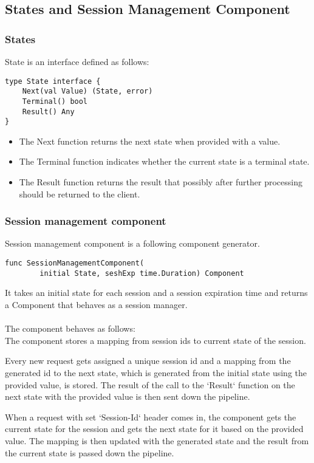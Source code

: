 \documentclass[12pt,a4paper]{article}
\begin{document}
\subsection{States and Session Management Component}
\subsubsection{States}
State is an interface defined as follows:

\begin{lstlisting}
type State interface {
    Next(val Value) (State, error)
    Terminal() bool
    Result() Any
}
\end{lstlisting}
\begin{itemize}
	\item The Next function returns the next state when provided with a value.
	\item The Terminal function indicates whether the current state is a terminal state.
	\item The Result function returns the result that possibly after further 
				processing should be returned to the client.
\end{itemize}

\subsubsection{Session management component}
Session management component is a following component generator.
\begin{lstlisting}
func SessionManagementComponent(
		initial State, seshExp time.Duration) Component
\end{lstlisting}
It takes an initial state for each session and a session expiration time and 
returns a Component that behaves as a session manager. 
\\
\\
The component behaves as follows:
\\
The component stores a mapping from session ids to current state of the session.

Every new request gets assigned a unique session id and a mapping from the generated 
id to the next state, which is generated from the initial state using the provided value,
is stored. The result of the call to the `Result` function on the next state with the provided 
value is then sent down the pipeline.

When a request with set `Session-Id` header comes in, the component gets the current 
state for the session and gets the next state for it based on the provided value.
The mapping is then updated with the generated state and the result from the current state
is passed down the pipeline.
\end{document}
